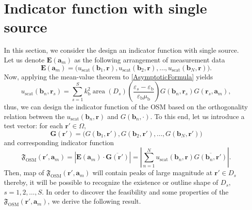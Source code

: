 \documentclass[3p,10pt]{elsarticle}
\newcommand{\eps}{\varepsilon}
\newcommand{\kb}{k_{\mathrm{b}}}
\newcommand{\epsb}{\varepsilon_{\mathrm{b}}}
\newcommand{\mub}{\mu_{\mathrm{b}}}
\newcommand{\ma}{\mathbf{a}}
\newcommand{\mb}{\mathbf{b}}
\newcommand{\mr}{\mathbf{r}}
\newcommand{\mE}{\mathbf{E}}
\newcommand{\mG}{\mathbf{G}}
\DeclareMathOperator*{\osm}{OSM}
\DeclareMathOperator*{\scat}{scat}
\DeclareMathOperator*{\area}{area}
\theoremstyle{plain}
\theoremstyle{remark}
\begin{document}
\section{Indicator function with single source}\label{sec:3}
In this section, we consider the design an indicator function with single source. Let us denote $\mE(\ma_m)$ as the following arrangement of measurement data
\begin{equation}\label{ArrangementE}
\mE(\ma_m)=\Big(u_{\scat}(\mb_1,\mr),u_{\scat}(\mb_2,\mr),\ldots,u_{\scat}(\mb_N,\mr)\Big).
\end{equation}
Now, applying the mean-value theorem to \eqref{AsymptoticFormula} yields
\[u_{\scat}(\mb_n,\mr_s)=\sum_{s=1}^{S}\kb^2\area(D_s)\left(\frac{\eps_s-\epsb}{\epsb\mub}\right)G(\mb_n,\mr_s)G(\mr_s,\ma_m),\]
thus, we can design the indicator function of the OSM based on the orthogonality relation between the $u_{\scat}(\mb_n,\mr)$ and $G(\mb_n,\cdot)$. To this end, let us introduce a test vector: for each $\mr'\in\Omega$,
\[\mG(\mr')=\Big(G(\mb_1,\mr'),G(\mb_2,\mr'),\ldots,G(\mb_N,\mr')\Big)\]
and corresponding indicator function
\[\mathfrak{F}_{\osm}(\mr',\ma_m)=|\mE(\ma_m)\cdot\overline{\mG(\mr')}|=\left|\sum_{n=1}^{N}u_{\scat}(\mb_n,\mr)\overline{G(\mb_n,\mr')}\right|.\]
Then, map of $\mathfrak{F}_{\osm}(\mr',\ma_m)$ will contain peaks of large magnitude at $\mr'\in D_s$ thereby, it will be possible to recognize the existence or outline shape of $D_s$, $s=1,2,\ldots,S$. In order to discover the feasibility and some properties of the $\mathfrak{F}_{\osm}(\mr',\ma_m)$, we derive the following result.
\end{document}
